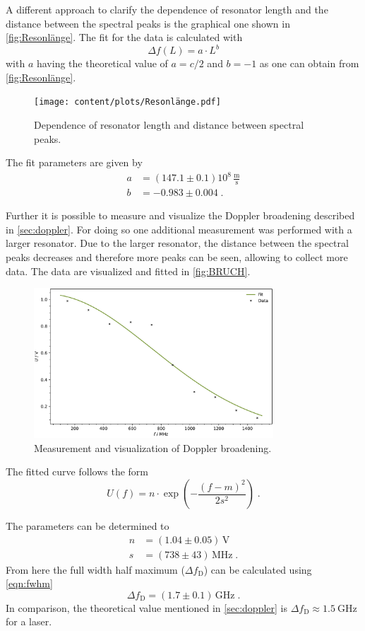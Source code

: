 A different approach to clarify the dependence of resonator length and the distance between the spectral peaks is the graphical one shown in \autoref{fig:Resonlänge}. The fit for the data is calculated with 
\begin{equation*}
    \Delta f(L)=a\cdot L^{b}
\end{equation*}
with $a$ having the theoretical value of $a=c/2$ and $b=-1$ as one can obtain from \autoref{fig:Resonlänge}.
\begin{figure}[h!]
    \centering
    \texttt{[image: content/plots/Resonlänge.pdf]}
    \caption{Dependence of resonator length and distance between spectral peaks.}
    \label{fig:Resonlänge}
\end{figure}
The fit parameters are given by 
\begin{align*}
    a&= (147.1 \pm 0.1) 10^8\, \frac{\text{m}}{\text{s}} \\
    b&= -0.983 \pm 0.004\; .
\end{align*}

Further it is possible to measure and visualize the Doppler broadening described in \autoref{sec:doppler}. For doing so one additional measurement was performed with a larger resonator. Due to the larger resonator, the distance between the spectral peaks decreases and therefore more peaks can be seen, allowing to collect more data. The data are visualized and fitted in \autoref{fig:BRUCH}.
\begin{figure}[h!]
    \centering
    \includegraphics[width=0.8\textwidth]{content/plots/AUA.pdf}
    \caption{Measurement and visualization of Doppler broadening.}
    \label{fig:BRUCH}
\end{figure}
The fitted curve follows the form 
\begin{equation*}
    U(f)= n\cdot \exp\left(-\frac{(f-m)^2}{2s^2}\right)\; .
\end{equation*}

The parameters can be determined to
\begin{align*}
    n &= (1.04 \pm 0.05)\, \text{V} \\
    s &= (738 \pm 43) \, \text{MHz}\; .
\end{align*}
From here the full width half maximum ($\Delta f_{\text{D}}$) can be calculated using \eqref{eqn:fwhm}
\begin{equation*}
    \Delta f_{\text{D}} = (1.7 \pm 0.1) \, \text{GHz}\; . 
\end{equation*}
In comparison, the theoretical value mentioned in \autoref{sec:doppler} is $\Delta f_\text{D} \approx \qty{1.5}{\giga\hertz}$ for a \HeNe laser.
